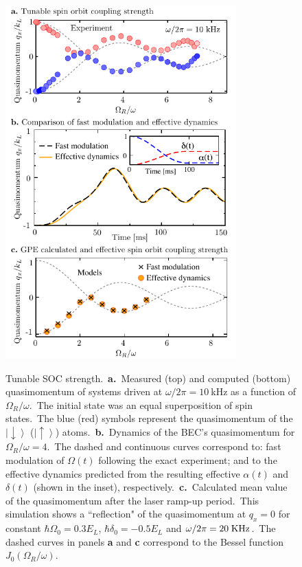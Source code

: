 \documentclass[twocolumn,amsmath,amssymb,floatfix,prl]{revtex4-1}
\newcommand{\ket}[1]{\left|#1\right>}
\begin{document}
\begin{figure}
 \begin{center}
 \includegraphics[width=3.5in]{epsfiles/Figure3.pdf}\\
 \end{center}
 \vspace{-0pt}
 \caption[Tunable SOC strength.]{Tunable SOC strength.~{\bf a.}~Measured (top) and computed (bottom) quasimomentum of systems driven at $\omega /2\pi = 10~$kHz as a function of $\Omega_R/\omega$.~The initial state was an equal superposition of spin states.~The blue (red) symbols represent the quasimomentum of the $\ket{\downarrow}$ ($\ket{\uparrow}$) atoms.~{\bf b.}~Dynamics of the BEC's quasimomentum for $\Omega_R/\omega = 4$.~The dashed and continuous curves correspond to: fast modulation of $\Omega(t)$ following the exact experiment; and to the effective dynamics predicted from the resulting effective  $\alpha(t)$ and $\delta(t)$ (shown in the inset), respectively.~{\bf c.}~Calculated mean value of the quasimomentum after the laser ramp-up period.~This simulation shows a ``reflection" of the quasimomentum at $q_x = 0$ for constant $\hbar \Omega_0 = 0.3 E_L$, $\hbar \delta_0 = -0.5E_L$ and $\omega/2\pi = 20\;{\rm KHz}$.~The dashed curves in panels {\bf a} and {\bf c} correspond to the Bessel function $J_0(\Omega_R/\omega)$.}
 \label{fig:TunableSOC}
\end{figure}
\end{document}
